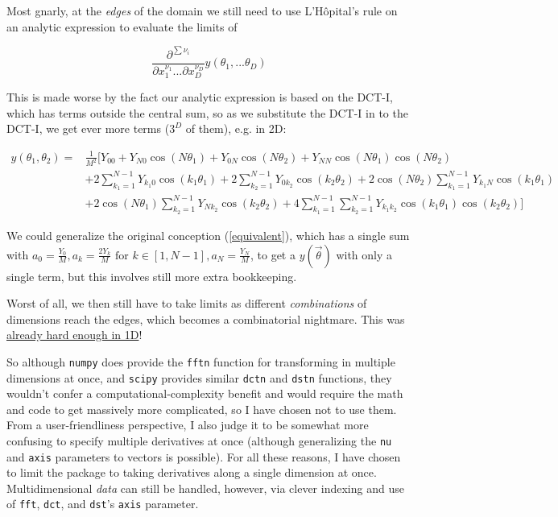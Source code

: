 \documentclass[10pt]{article}
\begin{document}
Most gnarly, at the \textit{edges} of the domain we still need to use L'Hôpital's rule on an analytic expression to evaluate the limits of

$$\frac{\partial^{\sum\nu_i}}{\partial x_1^{\nu_1} ... \partial x_D^{\nu_D}} y(\theta_1, ... \theta_D)$$

This is made worse by the fact our analytic expression is based on the DCT-I, which has terms outside the central sum, so as we substitute the DCT-I in to the DCT-I, we get ever more terms ($3^D$ of them), e.g. in 2D:

\begin{align*}
y(\theta_1, \theta_2) =& \frac{1}{M^2} \Big[ Y_{00} + Y_{N0}\cos(N\theta_1) + Y_{0N}\cos(N\theta_2) + Y_{NN}\cos(N\theta_1)\cos(N\theta_2)\\
&+ 2\sum_{k_1 = 1}^{N-1} Y_{k_1 0} \cos(k_1 \theta_1) + 2\sum_{k_2 = 1}^{N-1} Y_{0 k_2} \cos(k_2 \theta_2) + 2\cos(N\theta_2) \sum_{k_1 = 1}^{N-1} Y_{k_1 N} \cos(k_1 \theta_1)\\
&+ 2\cos(N\theta_1) \sum_{k_2 = 1}^{N-1} Y_{N k_2} \cos(k_2 \theta_2) + 4 \sum_{k_1 = 1}^{N-1} \sum_{k_2 = 1}^{N-1} Y_{k_1 k_2} \cos(k_1 \theta_1) \cos(k_2 \theta_2)\Big]
\end{align*}

We could generalize the original conception (\autoref{equivalent}), which has a single sum with $a_0 = \frac{Y_0}{M}, a_k = \frac{2 Y_k}{M} \text{ for } k \in [1, N-1], a_N = \frac{Y_N}{M}$, to get a $y(\vec{\theta})$ with only a single term, but this involves still more extra bookkeeping.

Worst of all, we then still have to take limits as different \textit{combinations} of dimensions reach the edges, which becomes a combinatorial nightmare. This was \hyperref[endpoints]{already hard enough in 1D}!

So although \texttt{numpy} does provide the \texttt{fftn} function for transforming in multiple dimensions at once, and \texttt{scipy} provides similar \texttt{dctn} and \texttt{dstn} functions, they wouldn't confer a computational-complexity benefit and would require the math and code to get massively more complicated, so I have chosen not to use them. From a user-friendliness perspective, I also judge it to be somewhat more confusing to specify multiple derivatives at once (although generalizing the \texttt{nu} and \texttt{axis} parameters to vectors is possible). For all these reasons, I have chosen to limit the package to taking derivatives along a single dimension at once. Multidimensional \textit{data} can still be handled, however, via clever indexing and use of \texttt{fft}, \texttt{dct}, and \texttt{dst}'s \texttt{axis} parameter.
\end{document}
